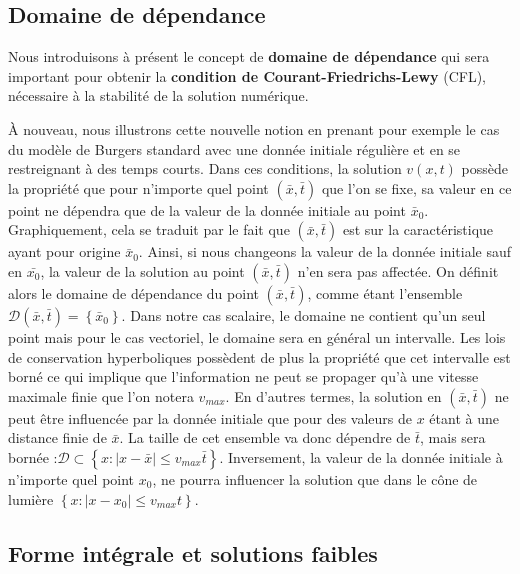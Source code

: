 \documentclass[11pt,a4paper]{article}
\begin{document}

\subsection{Domaine de dépendance}\label{domaine_dependance}

Nous introduisons à présent le concept de \textbf{domaine de dépendance} qui sera important pour obtenir la \textbf{condition de Courant-Friedrichs-Lewy} (CFL), nécessaire à la stabilité de la solution numérique.

\`{A} nouveau, nous illustrons cette nouvelle notion en prenant pour exemple le cas du modèle de Burgers standard avec une donnée initiale régulière et en se restreignant à des temps courts. Dans ces conditions, la solution $v(x,t)$ possède la propriété que pour n'importe quel point $(\bar{x},\bar{t})$ que l'on se fixe, sa valeur en ce point ne dépendra que de la valeur de la donnée initiale au point $\bar{x}_0$. Graphiquement, cela se traduit par le fait que $(\bar{x},\bar{t})$ est sur la caractéristique ayant pour origine $\bar{x}_0$. Ainsi, si nous changeons la valeur de la donnée initiale sauf en $\bar{x_0}$, la valeur de la solution au point $\left(\bar{x},\bar{t}\right)$ n'en sera pas affectée. On définit alors le domaine de dépendance du point $(\bar{x}, \bar{t})$, comme étant l'ensemble $\mathcal{D}(\bar{x},\bar{t}) = \left\{\bar{x}_0\right\}$. Dans notre cas scalaire, le domaine ne contient qu'un seul point mais pour le cas vectoriel, le domaine sera en général un intervalle. Les lois de conservation hyperboliques possèdent de plus la propriété que cet intervalle est borné ce qui implique que l'information ne peut se propager qu'à une vitesse maximale finie que l'on notera $v_{max}$. En d'autres termes, la solution en $(\bar{x},\bar{t})$ ne peut être influencée par la donnée initiale que pour des valeurs de $x$ étant à une distance finie de $\bar{x}$. La taille de cet ensemble va donc dépendre  de $\bar{t}$, mais sera bornée :$\mathcal{D}\subset \left\{x: |x - \bar{x}|\leq v_{max}\bar{t}\right\}$. Inversement, la valeur de la donnée initiale à n'importe quel point $x_0$, ne pourra influencer la solution que dans le cône de lumière $\left\{x:|x-x_0|\leq v_{max}t\right\}$.%

\subsection{Forme intégrale et solutions faibles}
\end{document}
